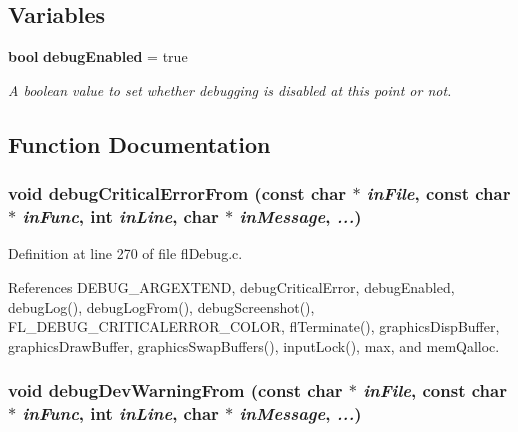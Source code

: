 \subsection*{Variables}
\begin{CompactItemize}
\item 
{\bf bool} {\bf debug\-Enabled} = true
\begin{CompactList}\small\item\em A boolean value to set whether debugging is disabled at this point or not. \item\end{CompactList}\end{CompactItemize}


\subsection{Function Documentation}
\subsubsection{\setlength{\rightskip}{0pt plus 5cm}void debug\-Critical\-Error\-From (const char $\ast$ {\em in\-File}, const char $\ast$ {\em in\-Func}, int {\em in\-Line}, char $\ast$ {\em in\-Message},  {\em ...})}\label{flDebug_8c_f7b8726be0c7d77f33f037efc03f06cf}




Definition at line 270 of file fl\-Debug.c.

References DEBUG\_\-ARGEXTEND, debug\-Critical\-Error, debug\-Enabled, debug\-Log(), debug\-Log\-From(), debug\-Screenshot(), FL\_\-DEBUG\_\-CRITICALERROR\_\-COLOR, fl\-Terminate(), graphics\-Disp\-Buffer, graphics\-Draw\-Buffer, graphics\-Swap\-Buffers(), input\-Lock(), max, and mem\-Qalloc.
\subsubsection{\setlength{\rightskip}{0pt plus 5cm}void debug\-Dev\-Warning\-From (const char $\ast$ {\em in\-File}, const char $\ast$ {\em in\-Func}, int {\em in\-Line}, char $\ast$ {\em in\-Message},  {\em ...})}\label{flDebug_8c_4d07cff8a1476a26ecd6e675bb0cbe8f}




